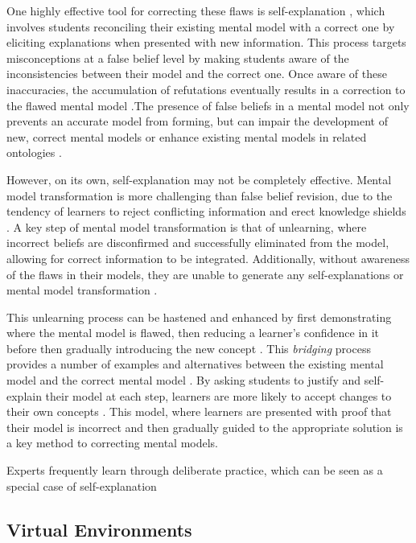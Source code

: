 One highly effective tool for correcting these flaws is self-explanation \citep{Chi1994}, which involves students reconciling their existing mental model with a correct one by eliciting explanations when presented with new information. This process targets misconceptions at a false belief level by making students aware of the inconsistencies between their model and the correct one. Once aware of these inaccuracies, the accumulation of refutations eventually results in a correction to the flawed mental model \citep{Chi2008}.The presence of false beliefs in a mental model not only prevents an accurate model from forming, but can impair the development of new, correct mental models or enhance existing mental models in related ontologies \citep{Jacobson2013}.

However, on its own, self-explanation may not be completely effective. Mental model transformation is more challenging than false belief revision, due to the tendency of learners to reject conflicting information and erect knowledge shields \citep{Klein2006}. A key step of mental model transformation is that of unlearning, where incorrect beliefs are disconfirmed and successfully eliminated from the model, allowing for correct information to be integrated. Additionally, without awareness of the flaws in their models, they are unable to generate any self-explanations \citep{Chi2002} or mental model transformation \citep{Chi2008}.

This unlearning process can be hastened and enhanced by first demonstrating where the mental model is flawed, then reducing a learner's confidence in it before then gradually introducing the new concept \citep{Klein2006}. This \emph{bridging} process provides a number of examples and alternatives between the existing mental model and the correct mental model \citep{Brown1989}. By asking students to justify and self-explain their model at each step, learners are more likely to accept changes to their own concepts \citep{Brown1989, Chi2008, Chi1994, Klein2006}. This model, where learners are presented with proof that their model is incorrect and then gradually guided to the appropriate solution is a key method to correcting mental models.

Experts frequently learn through deliberate practice, which can be seen as a special case of self-explanation

\subsection{Virtual Environments}

